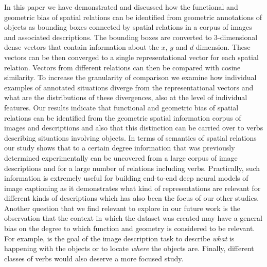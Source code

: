 In this paper we have demonstrated and discussed how the functional and
geometric bias of spatial relations can be identified from geometric
annotations of objects as bounding boxes connected by spatial
relations in a corpus of images and associated descriptions. The
bounding boxes are converted to 3-dimensional dense vectors that
contain information about the $x$, $y$ and $d$ dimension. These
vectors can be then converged to a single representational vector for
each spatial relation. Vectors from different relations can then be
compared with cosine similarity. To increase the granularity of
comparison we examine how individual examples of annotated situations
diverge from the representational vectors and what are the
distributions of these divergences, also at the level of individual
features. Our results indicate that functional and geometric bias of
spatial relations can be identified from the geometric spatial
information corpus of images and descriptions and also that this
distinction can be carried over to verbs describing situations
involving objects. In terms of semantics of spatial relations our
study shows that to a certain degree information that was previously
determined experimentally can be uncovered from a large corpus of
image descriptions and for a large number of relations including
verbs. Practically, such information is extremely useful for building
end-to-end deep neural models of image captioning as it demonstrates
what kind of representations are relevant for different kinds of
descriptions which has also been the focus of our other
studies. Another question that we find relevant to explore in our
future work is the observation that the context in which the dataset was
created may have a general bias on the degree to which function and
geometry is considered to be relevant. For example, is the goal of the
image description task to describe \emph{what} is happening with the
objects or to locate \emph{where} the objects are. Finally, different
classes of verbs would also deserve a more focused study.





\clearpage


